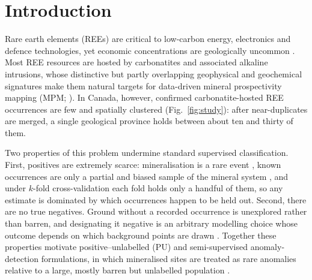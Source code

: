 \documentclass[pdflatex,sn-apa]{sn-jnl}
\begin{document}

\maketitle

\section{Introduction}\label{sec:intro}

Rare earth elements (REEs) are critical to low-carbon energy, electronics and defence technologies, yet economic concentrations are geologically uncommon \citep{Wang2020}. Most REE resources are hosted by carbonatites and associated alkaline intrusions, whose distinctive but partly overlapping geophysical and geochemical signatures make them natural targets for data-driven mineral prospectivity mapping (MPM; \citealp{Verplanck2014,Simandl2018}). In Canada, however, confirmed carbonatite-hosted REE occurrences are few and spatially clustered (Fig.~\ref{fig:study}): after near-duplicates are merged, a single geological province holds between about ten and thirty of them.

Two properties of this problem undermine standard supervised classification. First, positives are extremely scarce: mineralisation is a rare event \citep{Xiong2018}, known occurrences are only a partial and biased sample of the mineral system \citep{Coolbaugh2007,Parsa2021,Zuo2021}, and under $k$-fold cross-validation each fold holds only a handful of them, so any estimate is dominated by which occurrences happen to be held out. Second, there are no true negatives. Ground without a recorded occurrence is unexplored rather than barren, and designating it negative is an arbitrary modelling choice whose outcome depends on which background points are drawn \citep{Zuo2020}. Together these properties motivate positive--unlabelled (PU) and semi-supervised anomaly-detection formulations, in which mineralised sites are treated as rare anomalies relative to a large, mostly barren but unlabelled population \citep{Chen2019,Xiong2016,Xiong2021,Bekker2020,Luo2026}.
\end{document}
